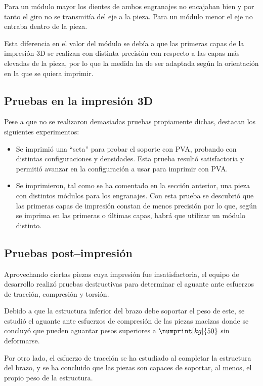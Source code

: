 Para un módulo mayor los dientes de ambos engranajes no encajaban bien y por tanto el giro no se transmitía del eje a la pieza. Para un módulo menor el eje no entraba dentro de la pieza.

Esta diferencia en el valor del módulo se debía a que las primeras capas de la impresión
3D se realizan con distinta precisión con respecto a las capas más elevadas de la
pieza, por lo que la medida ha de ser adaptada según la orientación en la que se quiera
imprimir.

\subsection{Pruebas en la impresión 3D}
Pese a que no se realizaron demasiadas pruebas propiamente dichas, destacan los siguientes
experimentos:

\begin{itemize}
    \item Se imprimió una ``seta'' para probar el soporte con \ac{PVA}, probando con
    distintas configuraciones y densidades. Esta prueba resultó satisfactoria y
    permitió avanzar en la configuración a usar para imprimir con \ac{PVA}.

    \item Se imprimieron, tal como se ha comentado en la sección anterior,
    una pieza con distintos módulos para los engranajes. Con esta prueba se descubrió
    que las primeras capas de impresión constan de menos precisión por lo que, según
    se imprima en las primeras o últimas capas, habrá que utilizar un módulo distinto.
\end{itemize}

\subsection{Pruebas post--impresión}
\label{pruebas_post_impresión}

Aprovechando ciertas piezas cuya impresión fue insatisfactoria, el equipo de desarrollo realizó pruebas destructivas para determinar el aguante ante esfuerzos de tracción, compresión y torsión.

Debido a que la estructura inferior del brazo debe soportar el peso de este, se estudió el aguante ante esfuerzos de compresión de las piezas macizas donde se concluyó que pueden aguantar pesos superiores a $\numprint[kg]{50}$ sin deformarse.

Por otro lado, el esfuerzo de tracción se ha estudiado al completar la estructura del brazo, y se ha concluido que las piezas son capaces de soportar, al menos, el propio peso de la estructura.

